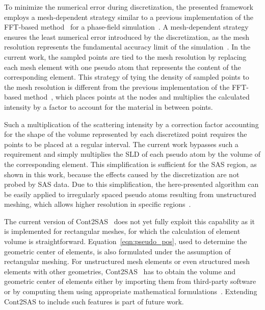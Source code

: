 \documentclass[preprint, 5p, times, twocolumn]{elsarticle}
\begin{document}
To minimize the numerical error during discretization, the presented framework employs a mesh-dependent strategy similar to a previous implementation of the FFT-based method~\cite{schmidt2007simulation} for a phase-field simulation~\cite{berbenni2025simulation}. A mesh-dependent strategy ensures the least numerical error introduced by the discretization, as the mesh resolution represents the fundamental accuracy limit of the simulation~\cite{wasisto2014finite,lo2002finite,suresh2014effect,heister2015primal}. In the current work, the sampled points are tied to the mesh resolution by replacing each mesh element with one pseudo atom that represents the content of the corresponding element. This strategy of tying the density of sampled points to the mesh resolution is different from the previous implementation of the FFT-based method~\cite{berbenni2025simulation}, which places points at the nodes and multiplies the calculated intensity by a factor to account for the material in between points.

Such a multiplication of the scattering intensity by a correction factor accounting for the shape of the volume represented by each discretized point requires the points to be placed at a regular interval. The current work bypasses such a requirement and simply multiplies the SLD of each pseudo atom by the volume of the corresponding element. This simplification is sufficient for the SAS region, as shown in this work, because the effects caused by the discretization are not probed by SAS data. Due to this simplification, the here-presented algorithm can be easily applied to irregularly spaced pseudo atoms resulting from unstructured meshing, which allows higher resolution in specific regions~\cite{zhuang2022phase}. 

The current version of Cont2SAS~\cite{cont2sas} does not yet fully exploit this capability as it is implemented for rectangular meshes, for which the calculation of element volume is straightforward. Equation~\ref{eqn:pseudo_pos}, used to determine the geometric center of elements, is also formulated under the assumption of rectangular meshing. For unstructured mesh elements or even structured mesh elements with other geometries, Cont2SAS~\cite{cont2sas} has to obtain the volume and geometric center of elements either by importing them from third-party software~\cite{ayachit2015paraview, moose} or by computing them using appropriate mathematical formulations~\cite{nurnberg2013calculating}. Extending Cont2SAS to include such features is part of future work.
\end{document}
